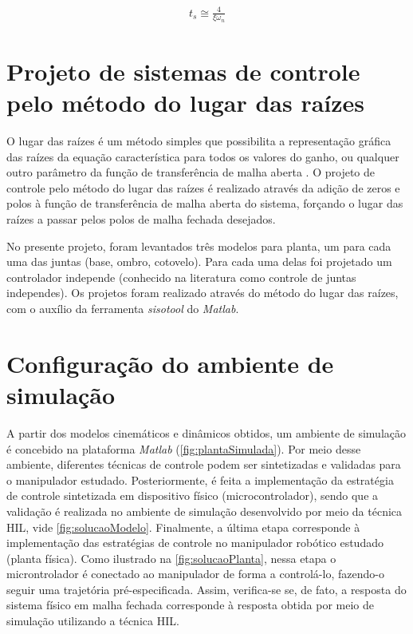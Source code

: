 \begin{equation}
  \begin{gathered}
    t_s \cong \frac{4}{\xi \omega_n}
  \end{gathered}
  \label{eq:tempoAcomodacao}
\end{equation}

\section{Projeto de sistemas de controle pelo método do lugar das raízes}

O lugar das raízes é um método simples que possibilita a representação gráfica das raízes da equação
característica para todos os valores do ganho, ou qualquer outro parâmetro da função de transferência
de malha aberta \cite{Ogata}. O projeto de controle pelo método do lugar das raízes é realizado através 
da adição de zeros e polos à função de transferência de malha aberta do sistema, forçando o lugar das raízes a passar 
pelos polos de malha fechada desejados.

No presente projeto, foram levantados três modelos para planta, um para cada uma das juntas (base, ombro, cotovelo).
Para cada uma delas foi projetado um controlador independe (conhecido na literatura como controle de juntas independes). Os projetos 
foram realizado através do método do lugar das raízes, com o auxílio da ferramenta \textit{sisotool} do \textit{Matlab}.

\section{Configuração do ambiente de simulação}

A partir dos modelos cinemáticos e dinâmicos obtidos, um ambiente de simulação é 
concebido na plataforma \textit{Matlab} (\autoref{fig:plantaSimulada}). Por meio desse 
ambiente, diferentes técnicas de controle podem ser sintetizadas e validadas para o manipulador estudado. 
Posteriormente, é feita a implementação da estratégia de controle sintetizada em dispositivo físico (microcontrolador),
sendo que a validação é realizada no ambiente de simulação 
desenvolvido por meio da técnica HIL, vide 
\autoref{fig:solucaoModelo}. Finalmente, a última etapa corresponde à implementação das 
estratégias de controle no manipulador robótico estudado (planta física). Como ilustrado 
na \autoref{fig:solucaoPlanta}, nessa etapa o microntrolador é conectado ao manipulador de 
forma a controlá-lo, fazendo-o seguir uma trajetória pré-especificada. Assim, verifica-se 
se, de fato, a resposta do sistema físico em malha fechada corresponde à resposta obtida 
por meio de simulação utilizando a técnica HIL.

